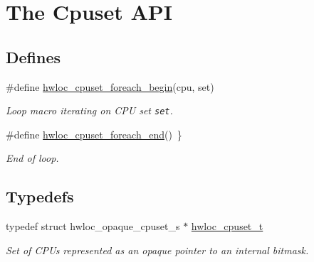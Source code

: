 \hypertarget{group__hwlocality__cpuset}{
\section{The Cpuset API}
\label{group__hwlocality__cpuset}
}
\subsection*{Defines}
\begin{CompactItemize}
\item 
\#define \hyperlink{group__hwlocality__cpuset_g8f896ce703ad1740fdf9ce8ac6361359}{hwloc\_\-cpuset\_\-foreach\_\-begin}(cpu, set)
\begin{CompactList}\small\item\em Loop macro iterating on CPU set {\tt set}. \item\end{CompactList}\item 
\#define \hyperlink{group__hwlocality__cpuset_ge2974be78a7d7cddbd38cb23fcc6240a}{hwloc\_\-cpuset\_\-foreach\_\-end}()~\}
\begin{CompactList}\small\item\em End of loop. \item\end{CompactList}\end{CompactItemize}
\subsection*{Typedefs}
\begin{CompactItemize}
\item 
typedef struct hwloc\_\-opaque\_\-cpuset\_\-s $\ast$ \hyperlink{group__hwlocality__cpuset_g82e51d695c430832b703dad5ab8d75e4}{hwloc\_\-cpuset\_\-t}
\begin{CompactList}\small\item\em Set of CPUs represented as an opaque pointer to an internal bitmask. \item\end{CompactList}\end{CompactItemize}
